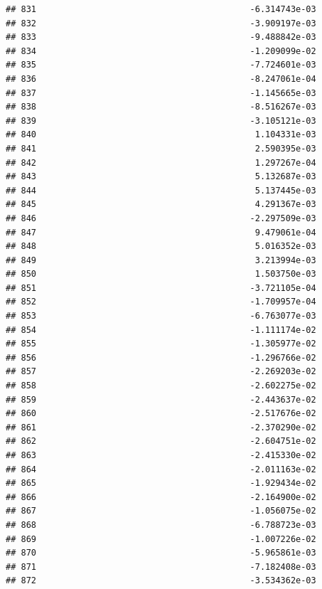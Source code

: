 \documentclass[
]{article}
\begin{document}
\begin{verbatim}
## 831                                          -6.314743e-03
## 832                                          -3.909197e-03
## 833                                          -9.488842e-03
## 834                                          -1.209099e-02
## 835                                          -7.724601e-03
## 836                                          -8.247061e-04
## 837                                          -1.145665e-03
## 838                                          -8.516267e-03
## 839                                          -3.105121e-03
## 840                                           1.104331e-03
## 841                                           2.590395e-03
## 842                                           1.297267e-04
## 843                                           5.132687e-03
## 844                                           5.137445e-03
## 845                                           4.291367e-03
## 846                                          -2.297509e-03
## 847                                           9.479061e-04
## 848                                           5.016352e-03
## 849                                           3.213994e-03
## 850                                           1.503750e-03
## 851                                          -3.721105e-04
## 852                                          -1.709957e-04
## 853                                          -6.763077e-03
## 854                                          -1.111174e-02
## 855                                          -1.305977e-02
## 856                                          -1.296766e-02
## 857                                          -2.269203e-02
## 858                                          -2.602275e-02
## 859                                          -2.443637e-02
## 860                                          -2.517676e-02
## 861                                          -2.370290e-02
## 862                                          -2.604751e-02
## 863                                          -2.415330e-02
## 864                                          -2.011163e-02
## 865                                          -1.929434e-02
## 866                                          -2.164900e-02
## 867                                          -1.056075e-02
## 868                                          -6.788723e-03
## 869                                          -1.007226e-02
## 870                                          -5.965861e-03
## 871                                          -7.182408e-03
## 872                                          -3.534362e-03

\end{verbatim}
\end{document}
